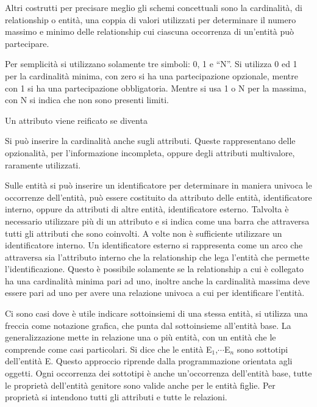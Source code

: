 \documentclass{article}
\numberwithin{equation}{subsection}
\begin{document}
Altri costrutti per precisare meglio gli schemi concettuali sono la cardinalità, di relationship o entità, una coppia di valori utilizzati per determinare il numero 
massimo e minimo delle relationship cui ciascuna occorrenza di un'entità può partecipare. 

Per semplicità si utilizzano solamente tre simboli: 0, 1 e ``N''. Si utilizza 0 ed 1 per la cardinalità minima, con zero si ha una partecipazione opzionale, mentre 
con 1 si ha una partecipazione obbligatoria. Mentre si usa 1 o N per la massima, con N si indica che non sono presenti limiti. 


Un attributo viene reificato se diventa %

Si può inserire la cardinalità anche sugli attributi. Queste rappresentano delle opzionalità, per l'informazione incompleta, oppure degli attributi multivalore, 
raramente utilizzati. 

Sulle entità si può inserire un identificatore per determinare in maniera univoca le occorrenze dell'entità, può essere costituito da attributo delle entità, 
identificatore interno, oppure da attributi di altre entità, identificatore esterno. Talvolta è necessario utilizzare più di un attributo e si indica come una barra che 
attraversa tutti gli attributi che sono coinvolti. A volte non è sufficiente utilizzare un identificatore interno. Un identificatore esterno si rappresenta 
come un arco che attraversa sia l'attributo interno che la relationship che lega l'entità che permette l'identificazione. 
Questo è possibile solamente se la relationship a cui è collegato ha una cardinalità minima pari ad uno, inoltre anche la cardinalità massima deve essere pari ad uno 
per avere una relazione univoca a cui per identificare l'entità. 




Ci sono casi dove è utile indicare sottoinsiemi di una stessa entità, si utilizza una freccia come notazione grafica, che punta dal sottoinsieme all'entità base. 
La generalizzazione mette in relazione una o più entità, con un entità che le comprende come casi particolari. Si dice che le entità E$_1$,$\cdots$E$_n$ sono 
sottotipi dell'entità E. Questo approccio riprende dalla programmazione orientata agli oggetti. 
Ogni occorrenza dei sottotipi è anche un'occorrenza dell'entità base, tutte le proprietà dell'entità genitore sono valide anche per le entità figlie. Per proprietà 
si intendono tutti gli attributi e tutte le relazioni. 
\end{document}
